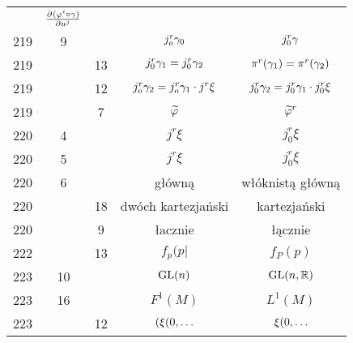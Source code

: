 \documentclass[a4paper,11pt]{article}
\begin{document}
\begin{center}
\begin{tabular}{|c|c|c|c|c|}
           & $\frac{ \partial^{  } {  ( { \varphi^{ i } } \circ \gamma )  } }{ \partial {  { u^{ j } }  }^{  } }$ \\
    219 &  9 & & $j_{ o }^{ r } \gamma_{ 0 }$ & $j_{ 0 }^{ r } \gamma$ \\
    219 & & 13 & $j_{ 0 }^{ r } \gamma_{ 1 } = j_{ 0 }^{ r } \gamma_{ 2 }$
           & $\pi^{ r } ( \gamma_{ 1 } ) = \pi^{ r }( \gamma_{ 2 } )$ \\
    219 & & 12 & $j^{ r }_{ o } \gamma_{ 2 } = j^{ r }_{ o } \gamma_{ 1 } \cdot j^{ r } \xi$
           & $j^{ r }_{ 0 } \gamma_{ 2 } = j^{ r }_{ 0 } \gamma_{ 1 } \cdot j^{ r }_{ 0 } \xi$ \\
    219 & &  7 & $\widetilde{ \varphi }$ & $\widetilde{ \varphi }^{ r }$ \\
    220 &  4 & & $j^{ r } \xi$ & $j^{ r }_{ 0 } \xi$ \\
    220 &  5 & & $j^{ r } \xi$ & $j^{ r }_{ 0 } \xi$ \\
    220 &  6 & & główną & włóknistą główną \\
    220 & & 18 & dwóch kartezjański & kartezjański \\
    220 & &  9 & łacznie & łącznie \\
    222 & & 13 & $f_{ p }( p |$ & $f_{ P }( p )$ \\
    223 & 10 & & $\mathrm{GL}( n )$ & $\mathrm{GL}( n ,\mathbb{R} )$ \\
    223 & 16 & & $F^{ 1 }( M )$ & $L^{ 1 }( M )$ \\
    223 & & 12 & $( \xi( 0, \ldots$ & $\xi( 0, \ldots$ \\
    \hline
  \end{tabular}


\end{center}
\end{document}
